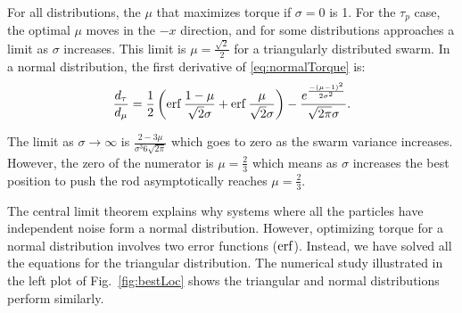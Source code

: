 For all distributions, the $\mu$ that maximizes torque if $\sigma = 0$ is 1. For the $\tau_{p}$ case, the optimal $\mu$ moves in the $-x$ direction, and for some distributions approaches a limit as $\sigma$ increases. This limit is $\mu = \frac{\sqrt{2}}{2}$ for a triangularly distributed swarm. %
In a normal distribution, the first derivative of \eqref{eq:normalTorque} is:
\begin{align}
\frac{d_{\tau}}{d_{\mu}}= \frac{1}{2}\left(\operatorname{erf}{\frac{1-\mu}{\sqrt{2}\sigma}}+ \operatorname{erf}{\frac{\mu}{\sqrt{2}\sigma}}\right)- \frac{e^{\frac{-(\mu-1)^2}{2\sigma^2}}}{\sqrt{2\pi}\sigma}.
\end{align}

The limit as $\sigma\to\infty$ is $\frac{2 - 3 \mu}{\sigma^3 6 \sqrt{2 \pi}}$ which goes to zero as the swarm variance increases. However, the zero of the numerator is $\mu = \frac{2}{3}$ which means as $\sigma$ increases the best position to push the rod asymptotically reaches $\mu = \frac{2}{3}$.

The central limit theorem explains why systems where all the particles have independent noise form a normal distribution. However, optimizing torque for a normal distribution involves two error functions ($\operatorname{erf}$). Instead, we have solved all the equations for the triangular distribution. The numerical study illustrated in the left plot of Fig.~\ref{fig:bestLoc} shows the triangular and normal distributions perform similarly.





